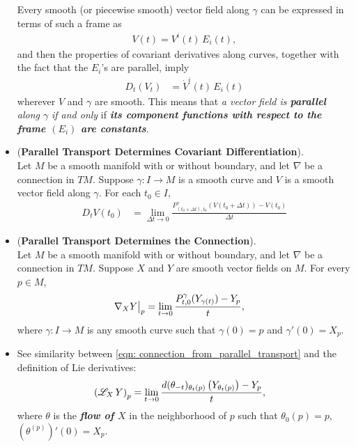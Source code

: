 \documentclass[11pt]{article}
\begin{document}
\begin{itemize}
\begin{remark}
Every smooth (or piecewise smooth) vector field along $\gamma$ can be expressed in terms of such a frame as 
\begin{align*}
V(t) = V^i(t)\, E_i(t),
\end{align*} and then the properties of covariant derivatives along curves, together with the fact that the $E_i$'s are parallel,
imply
\begin{align}
D_t(V_t) &= \dot{V}^i(t)\, E_i(t)  \label{eqn: parallel_transport_basis_vector_fields}
\end{align} wherever $V$ and $\gamma$ are smooth. This means that \emph{a vector field is \textbf{parallel} along $\gamma$} \emph{if and only} if \emph{\textbf{its component functions with respect to the frame $(E_i)$ are constants}}.
\end{remark}

\item \begin{theorem} (\textbf{Parallel Transport Determines Covariant Differentiation}). \citep{lee2018introduction}\\
Let $M$ be a smooth manifold with or without boundary, and let $\nabla$ be a connection in $TM$. Suppose $\gamma: I \rightarrow M$ is a smooth curve and $V$ is a smooth vector field along $\gamma$. For each $t_0 \in I$,
\begin{align}
D_t V(t_0) &=\lim_{\Delta t \rightarrow 0}\frac{P^{\gamma}_{(t_0+\Delta t), t_0}(V(t_0+\Delta t))  - V(t_0)}{\Delta t} \label{eqn: covariant_derivatives_from_parallel_transport}
\end{align}
\end{theorem}

\item \begin{corollary} (\textbf{Parallel Transport Determines the Connection}). \citep{lee2018introduction} \\
Let $M$ be a smooth manifold with or without boundary, and let  $\nabla$ be a connection in $TM$. Suppose $X$ and $Y$ are smooth vector fields on $M$. For every $p \in M$,
\begin{align}
\nabla_{X}{Y}\bigr|_{p}&=\lim_{t \rightarrow 0}\frac{P^{\gamma}_{t, 0}(Y_{\gamma(t)})  - Y_p}{t}, \label{eqn: connection_from_parallel_transport}
\end{align} where $\gamma: I \rightarrow M$ is any smooth curve such that $\gamma(0) = p$ and $\gamma'(0) = X_p$.
\end{corollary}

\item \begin{remark}
See similarity between \eqref{eqn: connection_from_parallel_transport} and the definition of Lie derivatives:
\begin{align*}
\left(\mathscr{L}_{X}\,Y\right)_{p}  &= \lim_{t\rightarrow 0}\frac{ d(\theta_{-t})_{\theta_{t}(p)}\left(Y_{\theta_t(p)}\right)   - Y_{p}}{t},
\end{align*} where $\theta$ is the \emph{\textbf{flow of $X$}} in the neighborhood of $p$ such that $\theta_0(p) = p$, $(\theta^{(p)})'(0) = X_p$.
\end{remark}


\end{itemize}
\end{document}
